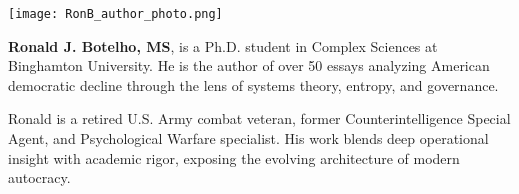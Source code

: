 \documentclass[12pt]{article}
\begin{document}
\begin{center}
    \texttt{[image: RonB\_author\_photo.png]}
\end{center}

\vspace{1em}

\noindent
\textbf{Ronald J. Botelho, MS}, is a Ph.D. student in Complex Sciences at Binghamton University. He is the author of over 50 essays analyzing American democratic decline through the lens of systems theory, entropy, and governance.

Ronald is a retired U.S. Army combat veteran, former Counterintelligence Special Agent, and Psychological Warfare specialist. His work blends deep operational insight with academic rigor, exposing the evolving architecture of modern autocracy.\\
\end{document}
